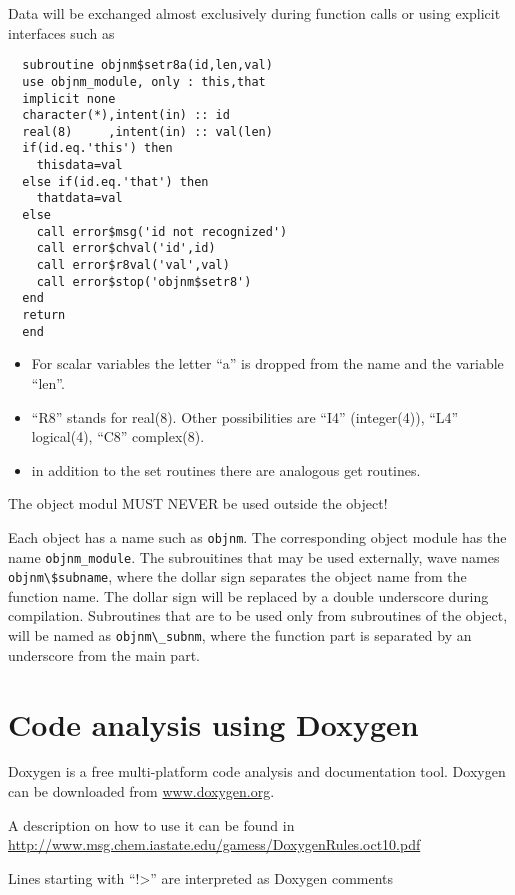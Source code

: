 \documentclass[11pt,a4paper]{report}
\begin{document}
Data will be exchanged almost exclusively during function calls or
 using explicit interfaces such as
\begin{verbatim}
  subroutine objnm$setr8a(id,len,val)
  use objnm_module, only : this,that
  implicit none
  character(*),intent(in) :: id
  real(8)     ,intent(in) :: val(len)
  if(id.eq.'this') then
    thisdata=val
  else if(id.eq.'that') then
    thatdata=val
  else
    call error$msg('id not recognized')
    call error$chval('id',id)
    call error$r8val('val',val)
    call error$stop('objnm$setr8')
  end
  return
  end
\end{verbatim}
\begin{itemize}
\item For scalar variables the letter ``a'' is dropped from the name and the
variable ``len''. 
%
\item ``R8'' stands for real(8). Other possibilities are ``I4''
  (integer(4)), ``L4'' logical(4), ``C8'' complex(8).
%
\item in addition to the set routines there are analogous get routines.
\end{itemize}

The object modul MUST NEVER be used outside the object!

Each object has a name such as \verb|objnm|. The corresponding object module
has the name \verb|objnm_module|. The subrouitines that may be used
externally, wave names \verb|objnm\$subname|, where the dollar sign
separates the object name from the function name. The dollar sign will
be replaced by a double underscore during compilation. Subroutines
that are to be used only from subroutines of the object, will be named
as \verb|objnm\_subnm|, where the function part is separated by an
underscore from the main part.

\chapter{Code analysis using Doxygen}
Doxygen is a free multi-platform code analysis and documentation tool.
Doxygen can be downloaded from \url{www.doxygen.org}.


A description on how to use it can be found in
\url{http://www.msg.chem.iastate.edu/gamess/DoxygenRules.oct10.pdf}


Lines starting with ``!>'' are interpreted as Doxygen comments
\end{document}
